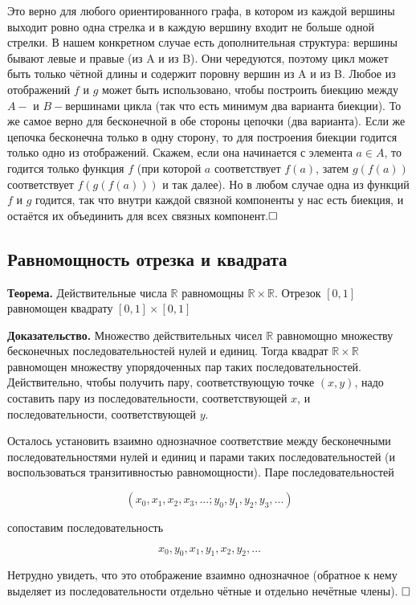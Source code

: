 \documentclass[a4paper, 10pt]{article}
\begin{document}
Это верно для любого ориентированного графа, в котором из каждой вершины выходит ровно одна стрелка и в каждую вершину входит не больше одной стрелки. В нашем конкретном случае есть дополнительная структура: вершины бывают левые и правые (из A и из B). Они чередуются, поэтому цикл может быть только чётной длины и содержит поровну вершин из A и из B. Любое из отображений $f$ и $g$ может быть использовано, чтобы построить биекцию между $A-$ и $B-$вершинами цикла (так что есть минимум два варианта биекции). То же самое верно для бесконечной в обе стороны цепочки (два варианта). Если же цепочка бесконечна только в одну сторону, то для построения биекции годится только одно из отображений. Скажем, если она начинается с элемента $a \in A$, то годится только функция $f$ (при которой $a$ соответствует $f(a)$, затем $g(f(a))$ соответствует $f(g(f(a)))$ и так далее). Но в любом случае одна из функций $f$ и $g$ годится, так что внутри каждой связной компоненты у нас есть биекция, и остаётся их объединить для всех связных компонент.$\hfill \square$






\subsection{Равномощность отрезка и квадрата}

\textbf{Теорема.} Действительные числа $\mathbb{R}$ равномощны $\mathbb{R} \times \mathbb{R}$. Отрезок $[0, 1]$ равномощен квадрату $[0, 1] \times [0, 1]$

\textbf{Доказательство.} Множество действительных чисел $\mathbb{R}$ равномощно множеству бесконечных последовательностей нулей и единиц. Тогда квадрат $\mathbb{R} \times \mathbb{R}$ равномощен множеству упорядоченных пар таких последовательностей. Действительно, чтобы получить пару, соответствующую точке $(x, y)$, надо составить пару из последовательности, соответствующей $x$, и последовательности, соответствующей $y$.

Осталось установить взаимно однозначное соответствие между бесконечными последовательностями нулей и единиц и парами таких последовательностей (и воспользоваться транзитивностью равномощности). Паре последовательностей

$$(x_0, x_1, x_2, x_3, ...; y_0, y_1, y_2, y_3, ...)$$

сопоставим последовательность

$$x_0, y_0, x_1, y_1, x_2, y_2, ...$$

Нетрудно увидеть, что это отображение взаимно однозначное (обратное к нему выделяет из последовательности отдельно чётные и отдельно нечётные члены). $\hfill \square$
\end{document}
